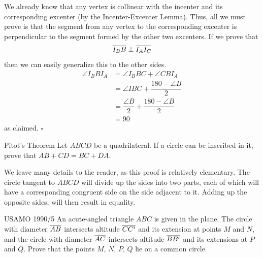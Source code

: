 \documentclass{article}
\begin{document}
We already know that any vertex is collinear with the incenter and its corresponding excenter (by the Incenter-Excenter Lemma). Thus, all we must prove is that the segment from any vertex to the corresponding excenter is perpendicular to the segment formed by the other two excenters. If we prove that \[\overline{I_BB} \perp \overline{I_AI_C}\] then we can easily generalize this to the other sides.
\begin{align*}
\angle I_BBI_A &= \angle I_BBC + \angle CBI_A \\
&= \angle IBC + \dfrac{180 - \angle B}{2} \\
&= \dfrac{\angle B}{2} + \dfrac{180 - \angle B}{2} \\
&= 90
\end{align*}
as claimed. $\square$

\newpage

\begin{problem}[2.25]{Pitot's Theorem}
Let $ABCD$ be a quadrilateral. If a circle can be inscribed in it, prove that $AB+CD = BC+DA$.
\end{problem}

We leave many details to the reader, as this proof is relatively elementary. The circle tangent to $ABCD$ will divide up the sides into two parts, each of which will have a corresponding congruent side on the side adjacent to it. Adding up the opposite sides, will then result in equality.

\begin{problem}[2.26]{USAMO 1990/5}
An acute-angled triangle $ABC$ is given in the plane. The circle with diameter $\overline{AB}$ intersects altitude $\overline{CC'}$ and its extension at points $M$ and $N$, and the circle with diameter $\overline{AC}$ intersects altitude $\overline{BB'}$ and its extensions at $P$ and $Q$. Prove that the points $M$, $N$, $P$, $Q$ lie on a common circle.
\end{problem}
\end{document}
